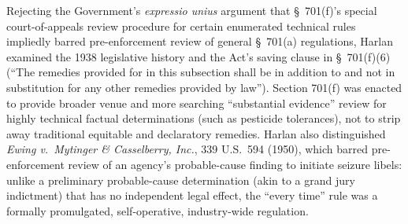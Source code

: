 \documentclass[12pt]{article}
\begin{document}
Rejecting the Government's \textit{expressio unius} argument that \S~701(f)'s special court-of-appeals review procedure for certain enumerated technical rules impliedly barred pre-enforcement review of general \S~701(a) regulations, Harlan examined the 1938 legislative history and the Act's saving clause in \S~701(f)(6) (``The remedies provided for in this subsection shall be in addition to and not in substitution for any other remedies provided by law''). Section 701(f) was enacted to provide broader venue and more searching ``substantial evidence'' review for highly technical factual determinations (such as pesticide tolerances), not to strip away traditional equitable and declaratory remedies. Harlan also distinguished \textit{Ewing v.\ Mytinger \& Casselberry, Inc.}, 339 U.S.\ 594 (1950), which barred pre-enforcement review of an agency's probable-cause finding to initiate seizure libels: unlike a preliminary probable-cause determination (akin to a grand jury indictment) that has no independent legal effect, the ``every time'' rule was a formally promulgated, self-operative, industry-wide regulation.
\end{document}
